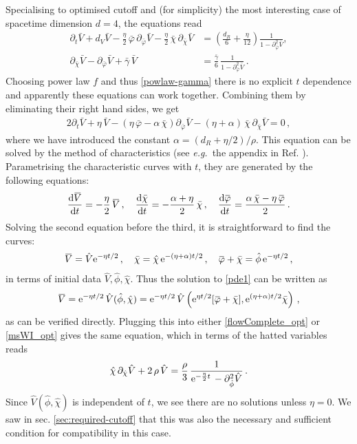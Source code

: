\documentclass[11pt]{book}
\newcommand{\overbar}[1]{\mkern 1.5mu\overline{\mkern-1.5mu#1\mkern-1.5mu}\mkern 1.5mu}
\newcommand{\bV}{\overbar V}
\newcommand{\bp}{\overbar \varphi}
\newcommand\eg{\textit{e.g.}\ }
\newcommand{\bc}{\bar \chi}
\newcommand{\hV}{\hat V}
\newcommand{\hp}{\hat \phi}
\newcommand{\hc}{\hat \chi}
\numberwithin{equation}{chapter}
\begin{document}
Specialising to optimised cutoff and (for simplicity) the most interesting case of spacetime dimension $d=4$,
the equations read
\begin{align}
  \label{flowComplete_opt}
  \partial_t\bar{V}+
  d_V \bar V - \frac{\eta}{2} \, \bar \varphi \, \partial_{\bar\varphi}\bar V -\frac{\eta}{2} \, \bar \chi \, \partial_{\bar\chi}\bar V &= \left(  \frac{d_R}{6} + \frac{\eta}{12} \right) \frac{1}{1 -  \partial^2_{\bar\varphi}\bar V},\\
  \label{msWI_opt}
  \partial_{\bar\chi}\bar V - \partial_{\bar\varphi}\bar V + \bar{\gamma} \, \bar V &= \frac{\bar{\gamma}}{6} \, \frac{1}{1 - \partial^2_{\bar\varphi}\bar V}\,.
\end{align}
Choosing power law $f$ and thus \eqref{powlaw-gamma} there is no explicit $t$ dependence and apparently
these equations can work together. Combining them by eliminating their right hand sides, we get
\begin{align}
  \label{pde1}
  2\partial_t\bar{V}+\eta \, \bar{V}-\left(\eta \, \bar\varphi-\alpha \, \bc\right)\partial_{\bar{\varphi}}\bar{V}-(\eta+\alpha) \, \bar\chi \, \partial_{\bar{\chi}} \bar{V}=0\,,
\end{align}
where we have introduced the constant $\alpha = (d_R+\eta/2)/\rho$.
This equation can be solved by the method of characteristics
(see \eg the appendix in Ref. \cite{Dietz:2015owa}). Parametrising the characteristic curves with $t$, they are generated by the following equations:
\begin{align}
  \frac{\mathrm d\bV}{\mathrm dt} = -\frac{\eta}{2} \, \bV\,,
  \quad
  \frac{\mathrm d\bc}{\mathrm dt}=-\frac{\alpha+\eta}{2} \, \bc\,,
  \quad
  \frac{\mathrm d\bp}{\mathrm dt}=\frac{\alpha\,\bc-\eta\,\bp}{2}\,.
\end{align}
Solving the second equation before the third, it is straightforward to find the curves:
\begin{align}
  \bV = \hV {\rm e}^{-\eta t/2}\,,\quad \bc = \hc\, {\rm e}^{-(\eta+\alpha)t/2}\,,\quad \bp+\bc = \hp\, {\rm e}^{-\eta t/2}\,,
\end{align}
in terms of initial data $\hV,\hp,\hc$.
Thus the solution to \eqref{pde1} can be written as
\begin{align}
  \bV ={\rm e}^{-\eta t/2}\, \hV(\hp,\hc) ={\rm e}^{-\eta t/2} \,\hV\left({\rm e}^{\eta t/2}[\bp+\bc],{\rm e}^{(\eta+\alpha)t/2}\bc\right)\,,
\end{align}
as can be verified directly. Plugging this into either \eqref{flowComplete_opt} or \eqref{msWI_opt}
gives the same equation, which in terms of the hatted variables reads
\begin{align}
  \hc \, \partial_{\hc}\hV + 2 \, \rho \, \hV = \frac{\rho}{3} \, \frac{1}{{\rm e}^{-\frac{\eta}{2} t} \,-\partial^2_{\hp}\hV}\,.
\end{align}
Since $\hV(\hp,\hc)$ is independent of $t$, we see there are no solutions unless $\eta=0$.
We saw in sec. \ref{sec:required-cutoff} that this was also the necessary and sufficient condition for
compatibility in this case.
\end{document}
